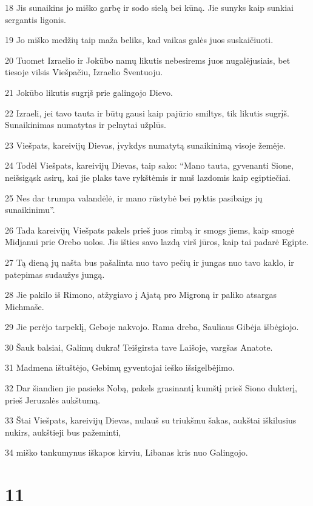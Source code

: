 \par 18 Jis sunaikins jo miško garbę ir sodo sielą bei kūną. Jie sunyks kaip sunkiai sergantis ligonis. 
\par 19 Jo miško medžių taip maža beliks, kad vaikas galės juos suskaičiuoti. 
\par 20 Tuomet Izraelio ir Jokūbo namų likutis nebesirems juos nugalėjusiais, bet tiesoje vilsis Viešpačiu, Izraelio Šventuoju. 
\par 21 Jokūbo likutis sugrįš prie galingojo Dievo. 
\par 22 Izraeli, jei tavo tauta ir būtų gausi kaip pajūrio smiltys, tik likutis sugrįš. Sunaikinimas numatytas ir pelnytai užplūs. 
\par 23 Viešpats, kareivijų Dievas, įvykdys numatytą sunaikinimą visoje žemėje. 
\par 24 Todėl Viešpats, kareivijų Dievas, taip sako: “Mano tauta, gyvenanti Sione, neišsigąsk asirų, kai jie plaks tave rykštėmis ir muš lazdomis kaip egiptiečiai. 
\par 25 Nes dar trumpa valandėlė, ir mano rūstybė bei pyktis pasibaigs jų sunaikinimu”. 
\par 26 Tada kareivijų Viešpats pakels prieš juos rimbą ir smogs jiems, kaip smogė Midjanui prie Orebo uolos. Jis išties savo lazdą virš jūros, kaip tai padarė Egipte. 
\par 27 Tą dieną jų našta bus pašalinta nuo tavo pečių ir jungas nuo tavo kaklo, ir patepimas sudaužys jungą. 
\par 28 Jie pakilo iš Rimono, atžygiavo į Ajatą pro Migroną ir paliko atsargas Michmaše. 
\par 29 Jie perėjo tarpeklį, Geboje nakvojo. Rama dreba, Sauliaus Gibėja išbėgiojo. 
\par 30 Šauk balsiai, Galimų dukra! Teišgirsta tave Laišoje, vargšas Anatote. 
\par 31 Madmena ištuštėjo, Gebimų gyventojai ieško išsigelbėjimo. 
\par 32 Dar šiandien jie pasieks Nobą, pakels grasinantį kumštį prieš Siono dukterį, prieš Jeruzalės aukštumą. 
\par 33 Štai Viešpats, kareivijų Dievas, nulauš su triukšmu šakas, aukštai iškilusius nukirs, aukštieji bus pažeminti, 
\par 34 miško tankumynus iškapos kirviu, Libanas kris nuo Galingojo.



\chapter{11}


